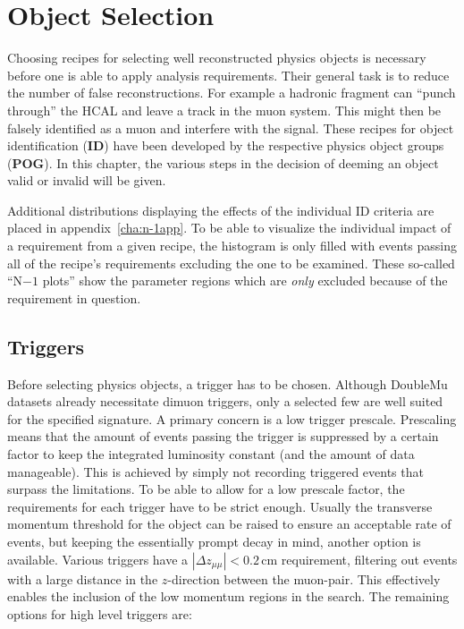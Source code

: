 \chapter{Object Selection}
\label{cha:objsel}

Choosing recipes for selecting well reconstructed physics objects is necessary before one is able to apply analysis requirements. Their general task is to reduce the number of false reconstructions. For example a hadronic fragment can ``punch through'' the HCAL and leave a track in the muon system. This might then be falsely identified as a muon and interfere with the signal. These recipes for object identification (\textbf{ID}) have been developed by the respective physics object groups (\textbf{POG}). In this chapter, the various steps in the decision of deeming an object valid or invalid will be given.

Additional distributions displaying the effects of the individual ID criteria are placed in appendix~\ref{cha:n-1app}. To be able to visualize the individual impact of a requirement from a given recipe, the histogram is only filled with events passing all of the recipe's requirements excluding the one to be examined. These so-called ``N$ - 1$ plots'' show the parameter regions which are \textit{only} excluded because of the requirement in question.

\section{Triggers}
\label{sec:trigger}

Before selecting physics objects, a trigger has to be chosen. Although DoubleMu datasets already necessitate dimuon triggers, only a selected few are well suited for the specified signature. A primary concern is a low trigger prescale. Prescaling means that the amount of events passing the trigger is suppressed by a certain factor to keep the integrated luminosity constant (and the amount of data manageable). This is achieved by simply not recording triggered events that surpass the limitations. To be able to allow for a low prescale factor, the requirements for each trigger have to be strict enough. Usually the transverse momentum threshold for the object can be raised to ensure an acceptable rate of events, but keeping the essentially prompt decay in mind, another option is available. Various triggers have a $|\Delta z_{\mu\mu}| < 0.2\,\text{cm}$ requirement, filtering out events with a large distance in the $z$-direction between the muon-pair. This effectively enables the inclusion of the low momentum regions in the search. The remaining options for high level triggers are:

